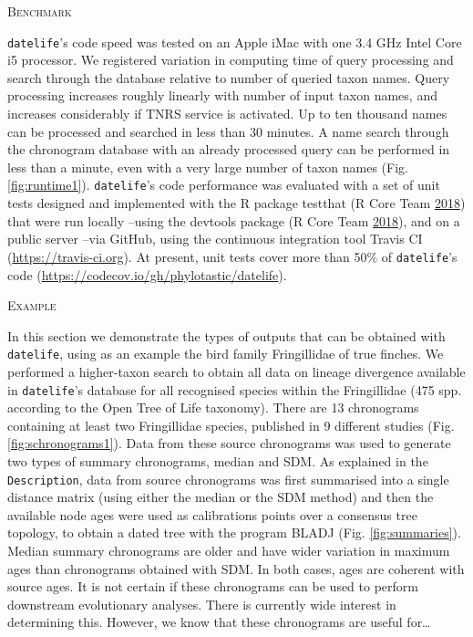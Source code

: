 \documentclass[]{article}
\begin{document}
\begin{center}
\textsc{Benchmark}
\end{center}

\texttt{datelife}'s code speed was tested on an Apple iMac
with one 3.4 GHz Intel Core i5 processor.
We registered variation in computing time of query processing and search through the database relative to number of queried taxon names.
Query processing increases roughly linearly with number of input taxon names, and
increases considerably if TNRS service is activated. Up to ten thousand names can be processed and searched in less than 30 minutes. A name search through the chronogram database with an already processed query can be performed in less than a minute, even with a very large number of taxon names (Fig. \ref{fig:runtime1}).
\texttt{datelife}'s code performance was evaluated with a set of unit tests designed and
implemented with the R package testthat (R Core Team \protect\hyperlink{ref-RCoreTeam2018}{2018}) that were run locally
--using the devtools package (R Core Team \protect\hyperlink{ref-RCoreTeam2018}{2018}), and on a public server --via
GitHub, using the continuous integration tool Travis CI (\url{https://travis-ci.org}). At
present, unit tests cover more than 50\% of \texttt{datelife}'s code (\url{https://codecov.io/gh/phylotastic/datelife}).

\begin{center}
\textsc{Example}
\end{center}

In this section we demonstrate the types of outputs that can be obtained with \texttt{datelife}, using as an example the bird family Fringillidae of true finches. We performed a higher-taxon search to obtain all data on lineage divergence available in \texttt{datelife}'s database for all recognised species within the Fringillidae (475 spp. according to the Open Tree of Life taxonomy). There are 13 chronograms containing at least two Fringillidae species, published in 9 different studies (Fig. \ref{fig:schronograms1}).
Data from these source chronograms was used to generate two types of summary chronograms, median and SDM. As explained in the \texttt{Description}, data from source chronograms was first summarised into a single distance matrix (using either the median or the SDM method) and then the available node ages were used as calibrations points over a consensus tree topology, to obtain a dated tree with the program BLADJ (Fig. \ref{fig:summaries}). Median summary chronograms are older and have wider variation in maximum ages than chronograms obtained with SDM. In both cases, ages are coherent with source ages.
It is not certain if these chronograms can be used to perform downstream evolutionary analyses. There is currently wide interest in determining this. However, we know that these chronograms are useful for\ldots{}
\end{document}
